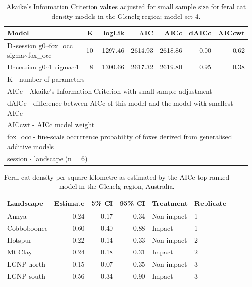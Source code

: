 \documentclass[]{elsarticle} %
\begin{document}
\begin{longtable}[t]{lrrrrrr}
\caption{\label{tab:density-aic-g-4}Akaike's Information Criterion values adjusted for small sample size for feral cat density models in the Glenelg region; model set 4.}\\
\toprule
Model & K & logLik & AIC & AICc & dAICc & AICcwt\\
\midrule
D\textasciitilde{}session g0\textasciitilde{}fox\_occ sigma\textasciitilde{}fox\_occ & 10 & -1297.46 & 2614.93 & 2618.86 & 0.00 & 0.62\\
D\textasciitilde{}session g0\textasciitilde{}1 sigma\textasciitilde{}1 & 8 & -1300.66 & 2617.32 & 2619.80 & 0.95 & 0.38\\
\bottomrule
\multicolumn{7}{l}{\rule{0pt}{1em}K - number of parameters}\\
\multicolumn{7}{l}{\rule{0pt}{1em}AICc - Akaike's Information Criterion with small-sample adjustment}\\
\multicolumn{7}{l}{\rule{0pt}{1em}dAICc - difference between AICc of this model and the model with smallest AICc}\\
\multicolumn{7}{l}{\rule{0pt}{1em}AICcwt - AICc model weight}\\
\multicolumn{7}{l}{\rule{0pt}{1em}fox\_occ - fine-scale occurrence probability of foxes derived from generalised additive models}\\
\multicolumn{7}{l}{\rule{0pt}{1em}session - landscape (n = 6)}\\
\end{longtable}
\endgroup{}

\newpage

\begingroup\fontsize{10}{12}\selectfont

\begin{longtable}[t]{lrrrll}
\caption{\label{tab:density-landscape-est}Feral cat density per square kilometre as estimated by the AICc top-ranked model in the Glenelg region, Australia.}\\
\toprule
Landscape & Estimate & 5\% CI & 95\% CI & Treatment & Replicate\\
\midrule
Annya & 0.24 & 0.17 & 0.34 & Non-impact & 1\\
Cobboboonee & 0.60 & 0.40 & 0.88 & Impact & 1\\
Hotspur & 0.22 & 0.14 & 0.33 & Non-impact & 2\\
Mt Clay & 0.24 & 0.18 & 0.31 & Impact & 2\\
LGNP north & 0.15 & 0.07 & 0.35 & Non-impact & 3\\
\addlinespace
LGNP south & 0.56 & 0.34 & 0.90 & Impact & 3\\
\bottomrule
\end{longtable}
\endgroup{}
\end{document}
